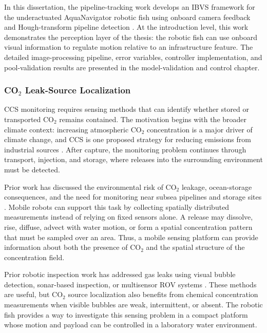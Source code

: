 \documentclass{uhcoethesis}
\begin{document}
In this dissertation, the pipeline-tracking work develops an IBVS framework for the underactuated AquaNavigator robotic fish using onboard camera feedback and Hough-transform pipeline detection \cite{Masood2025Pipeline}. At the introduction level, this work demonstrates the perception layer of the thesis: the robotic fish can use onboard visual information to regulate motion relative to an infrastructure feature. The detailed image-processing pipeline, error variables, controller implementation, and pool-validation results are presented in the model-validation and control chapter.

\subsubsection[CO2 Leak-Source Localization]{\mbox{CO$_2$} Leak-Source Localization}

CCS monitoring requires sensing methods that can identify whether stored or transported \mbox{CO$_2$} remains contained. The motivation begins with the broader climate context: increasing atmospheric \mbox{CO$_2$} concentration is a major driver of climate change, and CCS is one proposed strategy for reducing emissions from industrial sources \cite{Filonchyk2024,Kabir2023,Herzog2001,Yadav2022,Osman2021}. After capture, the monitoring problem continues through transport, injection, and storage, where releases into the surrounding environment must be detected.

Prior work has discussed the environmental risk of \mbox{CO$_2$} leakage, ocean-storage consequences, and the need for monitoring near subsea pipelines and storage sites \cite{Zheng2021,Mortezaei2021,Queiros2014,Pham2016}. Mobile robots can support this task by collecting spatially distributed measurements instead of relying on fixed sensors alone. A release may dissolve, rise, diffuse, advect with water motion, or form a spatial concentration pattern that must be sampled over an area. Thus, a mobile sensing platform can provide information about both the presence of \mbox{CO$_2$} and the spatial structure of the concentration field.

Prior robotic inspection work has addressed gas leaks using visual bubble detection, sonar-based inspection, or multisensor ROV systems \cite{Zhang2021,Qasem2019,Hu2022}. These methods are useful, but \mbox{CO$_2$} source localization also benefits from chemical concentration measurements when visible bubbles are weak, intermittent, or absent. The robotic fish provides a way to investigate this sensing problem in a compact platform whose motion and payload can be controlled in a laboratory water environment.
\end{document}
